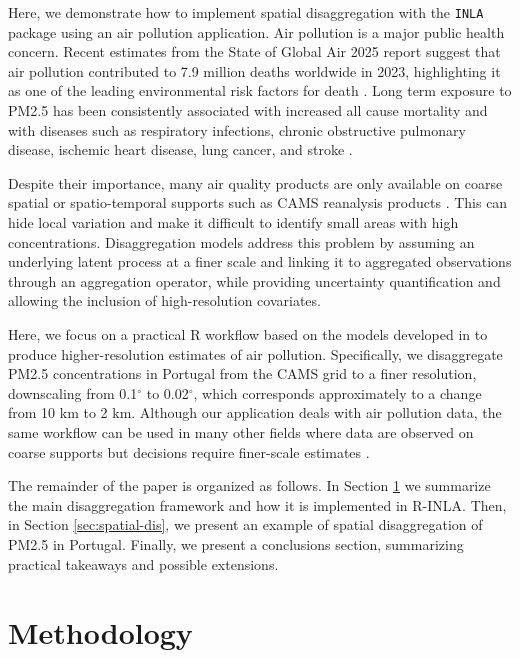 Here, we demonstrate how to implement spatial disaggregation with the \texttt{INLA} package using an air pollution application.
Air pollution is a major public health concern. Recent estimates from the State of Global Air 2025 report suggest that air pollution contributed to 7.9 million deaths worldwide in 2023, highlighting it as one of the leading environmental risk factors for death \citep{hei2025soga}. Long term exposure to PM2.5 has been consistently associated with increased all cause mortality and with diseases such as respiratory infections, chronic obstructive pulmonary disease, ischemic heart disease, lung cancer, and stroke \citep{cohen2017, burnett2018}.

Despite their importance, many air quality products are only available on coarse spatial or spatio-temporal supports such as CAMS reanalysis products \citep{inness2019cams}. This can hide local variation and make it difficult to identify small areas with high concentrations. Disaggregation models address this problem by assuming an underlying latent process at a finer scale and linking it to aggregated observations through an aggregation operator, while providing uncertainty quantification and allowing the inclusion of high-resolution covariates.

Here, we focus on a practical R workflow based on the models developed in \citep{moraga2017geostatistical} to produce higher-resolution estimates of air pollution.
Specifically, we disaggregate PM2.5 concentrations in Portugal from the CAMS grid to a finer resolution, downscaling from 0.1\(^\circ\) to 0.02\(^\circ\), which corresponds approximately to a change from 10 km to 2 km.
Although our application deals with air pollution data, the same workflow can be used in many other fields where data are observed on coarse supports but decisions require finer-scale estimates \citep{forlani2020joint, gomez2019multivariate}.

The remainder of the paper is organized as follows. In Section \ref{sec:methods} we summarize the main disaggregation framework and how it is implemented in R-INLA. Then, in Section \ref{sec:spatial-dis}, we present an example of spatial disaggregation of PM2.5 in Portugal. Finally, we present a conclusions section, summarizing practical takeaways and possible extensions.

\section{Methodology}\label{sec:methods}


